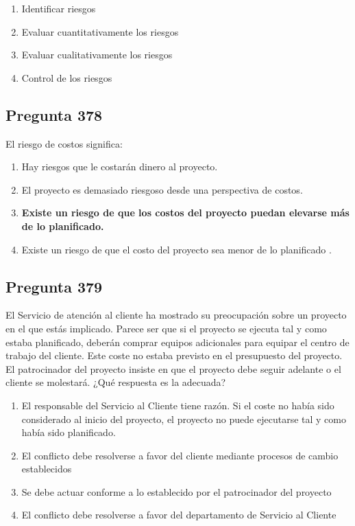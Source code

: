 \documentclass[11pt,a4paper]{article}
\begin{document}
\begin{enumerate}[label=\alph*)]
  \item Identificar riesgos
  \item Evaluar cuantitativamente los riesgos
  \item Evaluar cualitativamente los riesgos
  \item Control de los riesgos
\end{enumerate}

\subsection*{Pregunta 378}
El riesgo de costos significa:

\begin{enumerate}[label=\alph*)]
  \item Hay riesgos que le costarán dinero al proyecto.
  \item El proyecto es demasiado riesgoso desde una perspectiva de costos.
  \item \textbf{Existe un riesgo de que los costos del proyecto puedan elevarse más de lo planificado.}
  \item Existe un riesgo de que el costo del proyecto sea menor de lo planificado .
\end{enumerate}

\subsection*{Pregunta 379}
El Servicio de atención al cliente ha mostrado su preocupación sobre un proyecto en el que estás implicado. Parece ser que si el proyecto se ejecuta tal y como estaba planificado, deberán comprar equipos adicionales para equipar el centro de trabajo del cliente. Este coste no estaba previsto en el presupuesto del proyecto. El patrocinador del proyecto insiste en que el proyecto debe seguir adelante o el cliente se molestará. ¿Qué respuesta es la adecuada?

\begin{enumerate}[label=\alph*)]
  \item El responsable del Servicio al Cliente tiene razón. Si el coste no había sido considerado al inicio del proyecto, el proyecto no puede ejecutarse tal y como había sido planificado.
  \item El conflicto debe resolverse a favor del cliente mediante procesos de cambio establecidos
  \item Se debe actuar conforme a lo establecido por el patrocinador del proyecto
  \item El conflicto debe resolverse a favor del departamento de Servicio al Cliente
\end{enumerate}
\end{document}
